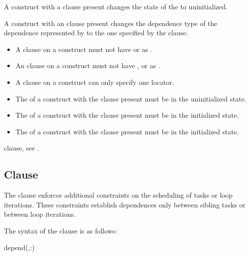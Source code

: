 A  construct with a  clause present changes the 
state of the  to uninitialized.

A  construct with an  clause present changes the 
dependence type of the dependence represented by  to the one 
specified by the  clause.

\restrictions
\begin{itemize}
\item A  clause on a  construct must not have 
       or  as .
\item An  clause on a  construct must not have
      ,  or  as .
\item A  clause on a  construct can only specify 
      one locator.
\item The  of a  construct with the  
      clause present must be in the uninitialized state.
\item The  of a  construct with the  
      clause present must be in the initialized state.
\item The  of a  construct with the  
      clause present must be in the initialized state.
\end{itemize}

\begin{crossrefs}
 \item {} clause, see .
\end{crossrefs}



\subsection{ Clause}
\label{subsec:depend Clause}
\summary
The  clause enforces additional constraints on the scheduling 
of tasks or loop iterations. These constraints establish dependences only 
between sibling tasks or between loop iterations.

\syntax
The syntax of the  clause is as follows:

\begin{ompSyntax}
depend(\plc{[depend-modifier},\plc{]dependence-type }:)
\end{ompSyntax}

